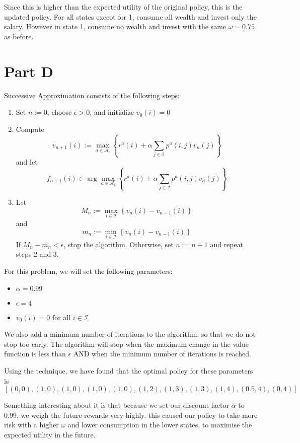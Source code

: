 \documentclass[12pt]{article}
\begin{document}
Since this is higher than the expected utility of the original policy, this is
the updated policy. For all states exceot for 1, consume all wealth and invest
only the salary. However in state 1, consume no wealth and invest with the same
$\omega=0.75$ as before.

\section{Part D}

Successive Approximation consists of the following steps:

\begin{enumerate}
	\item Set $n := 0$, choose $\epsilon > 0$, and initialize $v_0(i) = 0$
	\item Compute $$ v_{n+1}(i) := \max_{a \in \mathcal{A}_i} \left\{ r^a(i) + \alpha
		      \sum_{j \in \mathcal{I}} p^a(i,j)v_n(j) \right\} $$ and let $$ f_{n+1}(i) \in
		      \arg\max_{a \in \mathcal{A}_i} \left\{ r^a(i) + \alpha \sum_{j \in \mathcal{I}}
		      p^a(i,j)v_n(j) \right\} $$
	\item Let $$ M_n := \max_{i \in \mathcal{I}} \left\{ v_n(i) - v_{n-1}(i) \right\}$$
	      and $$ m_n := \min_{i \in \mathcal{I}} \left\{ v_n(i) - v_{n-1}(i) \right\} $$
	      If $M_n - m_n < \epsilon$, stop the algorithm. Otherwise, set $n := n + 1$ and
	      repeat steps 2 and 3.
\end{enumerate}

For this problem, we will set the following parameters:
\begin{itemize}
	\item $\alpha = 0.99$
	\item $\epsilon = 4$
	\item $v_0(i) = 0$ for all $i \in \mathcal{I}$
\end{itemize}

We also add a minimum number of iterations to the algorithm, so that we do not
stop too early. The algorithm will stop when the maximum change in the value
function is less than $\epsilon$ AND when the minimum number of iterations is
reached.

Using the technique, we have found that the optimal policy for these parameters
is $$[(0, 0), (1, 0), (1, 0), (1, 0), (1, 0), (1, 2), (1, 3), (1, 3), (1, 4),
			(0.5, 4), (0, 4)]$$

Something interesting about it is that because we set our discount factor
$\alpha$ to 0.99, we weigh the future rewards very highly. this caused our
policy to take more risk with a higher $\omega$ and lower consumption in the
lower states, to maximise the expected utility in the future.
\end{document}
